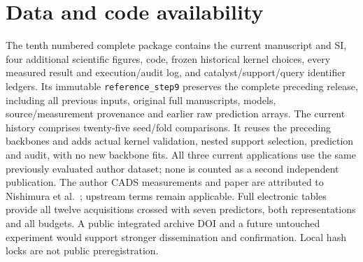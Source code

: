 \documentclass[11pt]{article}
\begin{document}
\section*{Data and code availability}
The tenth numbered complete package contains the current manuscript and SI, four additional scientific figures, code, frozen historical kernel choices, every measured result and execution/audit log, and catalyst/support/query identifier ledgers. Its immutable \texttt{reference\_step9} preserves the complete preceding release, including all previous inputs, original full manuscripts, models, source/measurement provenance and earlier raw prediction arrays. The current history comprises twenty-five seed/fold comparisons. It reuses the preceding backbones and adds actual kernel validation, nested support selection, prediction and audit, with no new backbone fits. All three current applications use the same previously evaluated author dataset; none is counted as a second independent publication. The author CADS measurements and paper are attributed to Nishimura et al.\ \cite{nishimura2023new}; upstream terms remain applicable. Full electronic tables provide all twelve acquisitions crossed with seven predictors, both representations and all budgets. A public integrated archive DOI and a future untouched experiment would support stronger dissemination and confirmation. Local hash locks are not public preregistration.


\end{document}
